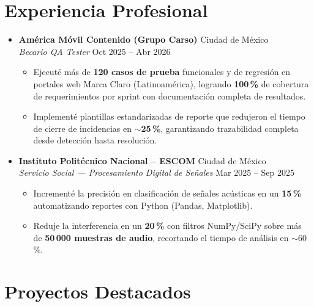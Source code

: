 \documentclass[a4paper,10pt]{article}
\begin{document}
\section{Experiencia Profesional}

\begin{itemize}
  \item \textbf{Am\'{e}rica M\'{o}vil Contenido (Grupo Carso)} \hfill Ciudad de M\'{e}xico\\
        \textit{Becario QA Tester} \hfill Oct 2025 -- Abr 2026
        \begin{itemize}
          \item Ejecut\'{e} m\'{a}s de \textbf{120 casos de prueba} funcionales y de regresi\'{o}n en
                portales web Marca Claro (Latinoam\'{e}rica), logrando \textbf{100\,\%} de cobertura
                de requerimientos por sprint con documentaci\'{o}n completa de resultados.
          \item Implement\'{e} plantillas estandarizadas de reporte que redujeron el tiempo de
                cierre de incidencias en $\sim$\textbf{25\,\%}, garantizando trazabilidad completa
                desde detecci\'{o}n hasta resoluci\'{o}n.
        \end{itemize}

  \item \textbf{Instituto Polit\'{e}cnico Nacional -- ESCOM} \hfill Ciudad de M\'{e}xico\\
        \textit{Servicio Social --- Procesamiento Digital de Se\~{n}ales} \hfill Mar 2025 -- Sep 2025
        \begin{itemize}
          \item Increment\'{e} la precisi\'{o}n en clasificaci\'{o}n de se\~{n}ales ac\'{u}sticas en un
                \textbf{15\,\%} automatizando reportes con Python (Pandas, Matplotlib).
          \item Reduje la interferencia en un \textbf{20\,\%} con filtros NumPy/SciPy sobre
                m\'{a}s de \textbf{50\,000 muestras de audio}, recortando el tiempo de an\'{a}lisis en $\sim$60\,\%.
        \end{itemize}
\end{itemize}

\section{Proyectos Destacados}
\end{document}
